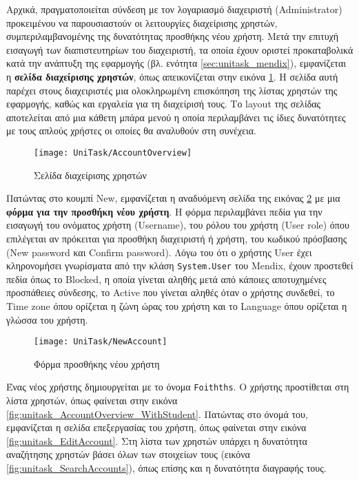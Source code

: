         Αρχικά, πραγματοποιείται σύνδεση με τον λογαριασμό διαχειριστή (Administrator) προκειμένου να παρουσιαστούν οι λειτουργίες διαχείρισης χρηστών, συμπεριλαμβανομένης της δυνατότητας προσθήκης νέου χρήστη. Μετά την επιτυχή εισαγωγή των διαπιστευτηρίων του διαχειριστή, τα οποία έχουν οριστεί προκαταβολικά κατά την ανάπτυξη της εφαρμογής (βλ. ενότητα \ref{sec:unitask_mendix}), εμφανίζεται η \textbf{σελίδα διαχείρισης χρηστών}, όπως απεικονίζεται στην εικόνα \ref{fig:unitask_AccountOverview}. Η σελίδα αυτή παρέχει στους διαχειριστές μια ολοκληρωμένη επισκόπηση της λίστας χρηστών της εφαρμογής, καθώς και εργαλεία για τη διαχείρισή τους. Το layout της σελίδας αποτελείται από μια κάθετη μπάρα μενού η οποία περιλαμβάνει τις ίδιες δυνατότητες με τους απλούς χρήστες οι οποίες θα αναλυθούν στη συνέχεια.

       \begin{figure}[h!] \noindent \centering
            \texttt{[image: UniTask/AccountOverview]}
            \caption{\centering Σελίδα διαχείρισης χρηστών}
            \label{fig:unitask_AccountOverview}
        \end{figure}

        Πατώντας στο κουμπί {\Zona New}, εμφανίζεται η αναδυόμενη σελίδα της εικόνας \ref{fig:unitask_NewAccount} με μια \textbf{φόρμα για την προσθήκη νέου χρήστη}. Η φόρμα περιλαμβάνει πεδία για την εισαγωγή του ονόματος χρήστη ({\Zona Username}), του ρόλου του χρήστη ({\Zona User role}) όπου επιλέγεται αν πρόκειται για προσθήκη διαχειριστή ή χρήστη, του κωδικού πρόσβασης ({\Zona New password} και {\Zona Confirm password}). Λόγω του ότι ο χρήστης User έχει κληρονομήσει γνωρίσματα από την κλάση \texttt{System.User} του Mendix, έχουν προστεθεί πεδία όπως το {\Zona Blocked}, η οποία γίνεται αληθής μετά από κάποιες αποτυχημένες προσπάθειες σύνδεσης, το {\Zona Active} που γίνεται αληθές όταν ο χρήστης συνδεθεί, το {\Zona Time zone} όπου ορίζεται η ζώνη ώρας του χρήστη και το {\Zona Language} όπου ορίζεται η γλώσσα του χρήστη.

        \begin{figure}[h!] \noindent \centering
            \texttt{[image: UniTask/NewAccount]}
            \caption{\centering Φόρμα προσθήκης νέου χρήστη}
            \label{fig:unitask_NewAccount}
        \end{figure}

        Ένας νέος χρήστης δημιουργείται με το όνομα \texttt{Foithths}. Ο χρήστης προστίθεται στη λίστα χρηστών, όπως φαίνεται στην εικόνα \ref{fig:unitask_AccountOverview_WithStudent}. Πατώντας στο όνομά του, εμφανίζεται η σελίδα επεξεργασίας του χρήστη, όπως φαίνεται στην εικόνα \ref{fig:unitask_EditAccount}. Στη λίστα των χρηστών υπάρχει η δυνατότητα αναζήτησης χρηστών βάσει όλων των στοιχείων τους (εικόνα \ref{fig:unitask_SearchAccounts}), όπως επίσης και η δυνατότητα διαγραφής τους.

